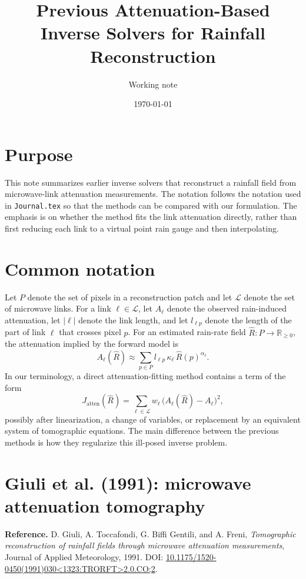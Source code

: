\documentclass[11pt]{article}
\title{Previous Attenuation-Based Inverse Solvers for Rainfall Reconstruction}
\author{Working note}
\date{\today}
\newcommand{\Rhat}{\hat{R}}
\newcommand{\Jatten}{J_{\mathrm{atten}}}
\begin{document}
\maketitle

\section*{Purpose}
This note summarizes earlier inverse solvers that reconstruct a rainfall field from microwave-link attenuation measurements.
The notation follows the notation used in \texttt{Journal.tex} so that the methods can be compared with our formulation.
The emphasis is on whether the method fits the link attenuation directly, rather than first reducing each link to a virtual point rain gauge and then interpolating.

\section*{Common notation}
Let $P$ denote the set of pixels in a reconstruction patch and let $\mathcal{L}$ denote the set of microwave links.
For a link $\ell\in\mathcal{L}$, let $A_\ell$ denote the observed rain-induced attenuation, let $|\ell|$ denote the link length, and let $l_{\ell p}$ denote the length of the part of link $\ell$ that crosses pixel $p$.
For an estimated rain-rate field $\Rhat:P\to\mathbb{R}_{\geq 0}$, the attenuation implied by the forward model is
\[
  A_\ell(\Rhat)
  \approx
  \sum_{p\in P} l_{\ell p}\,\kappa_\ell\,\Rhat(p)^{\alpha_\ell} .
\]
In our terminology, a direct attenuation-fitting method contains a term of the form
\[
  \Jatten(\Rhat)
  =
  \sum_{\ell\in\mathcal{L}} w_\ell\,
  \bigl(A_\ell(\Rhat)-A_\ell\bigr)^2,
\]
possibly after linearization, a change of variables, or replacement by an equivalent system of tomographic equations.
The main difference between the previous methods is how they regularize this ill-posed inverse problem.

\section{Giuli et al. (1991): microwave attenuation tomography}
\textbf{Reference.}
D. Giuli, A. Toccafondi, G. Biffi Gentili, and A. Freni,
\emph{Tomographic reconstruction of rainfall fields through microwave attenuation measurements},
Journal of Applied Meteorology, 1991.
DOI: \href{https://doi.org/10.1175/1520-0450(1991)030%3C1323:TRORFT%3E2.0.CO;2}{10.1175/1520-0450(1991)030<1323:TRORFT>2.0.CO;2}.
\end{document}
